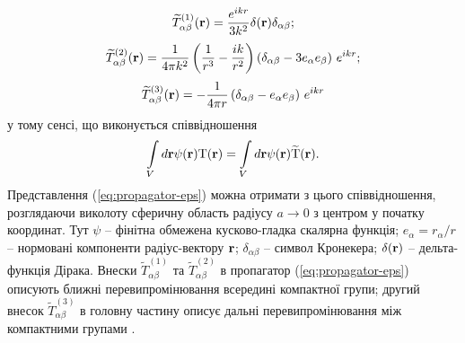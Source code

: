 \documentclass[14pt,twoside]{vakthesis}
\begin{document}
\begin{equation}\label{eq:propagator-eps-T1}
{\widetilde T}_{\alpha\beta}^{(1)} ({\rm {\bf r}}) = \frac{e^{ikr}}{3k^{2}} \delta({\bf r})\delta_{\alpha\beta};
\end{equation}
\begin{equation}\label{eq:propagator-eps-T2}
{\widetilde T}_{\alpha\beta}^{(2)} ({\rm {\bf r}}) = \frac{1}{4\pi k^{2}}
\left(\frac{1}{r^3}-\frac{ik}{r^2}\right)
\left( \delta _{\alpha\beta} - 3e_{\alpha} e_{\beta}
\right)\,e^{ikr};
\end{equation}
\begin{equation}\label{eq:propagator-eps-T3}
{\widetilde T}_{\alpha\beta}^{(3)} ({\rm {\bf r}}) = - \frac{1}{4\pi r}\left( {\delta
	_{\alpha\beta} - e_{\alpha} e_{\beta}} \right)\,e^{ikr}
\end{equation}
у тому сенсі, що виконується співвідношення
$$
\int\limits_V d{\bf r} \psi({\bf r}) {\rm T}({\bf r}) =
\int\limits_V d{\bf r} \psi({\bf r}) \widetilde{\rm T}({\bf r}).
$$
Представлення (\ref{eq:propagator-eps}) можна отримати з цього співвідношення, розглядаючи виколоту сферичну область радіусу $a\to 0$ з центром у початку координат. Тут $\psi$ -- фінітна обмежена кусково-гладка скалярна функція; $e_\alpha = r_\alpha/r$ -- нормовані компоненти радіус-вектору ${\bf r}$; $\delta_{\alpha\beta}$ -- символ Кронекера; $\delta({\bf r})$ -- дельта-функція Дірака.
Внески ${\widetilde T}_{\alpha\beta}^{(1)}$ та ${\widetilde T}_{\alpha\beta}^{(2)}$ в пропагатор (\ref{eq:propagator-eps})  описують ближні перевипромінювання всередині компактної групи; другий внесок ${\widetilde T}_{\alpha\beta}^{(3)}$ в головну частину описує дальні перевипромінювання між компактними групами \cite{Sushko2007, Sushko2017}.
\end{document}
